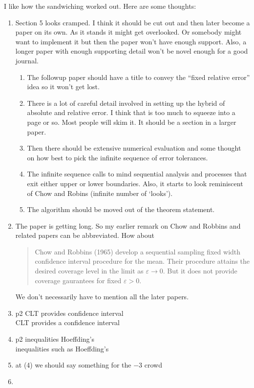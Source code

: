 \documentclass{article}
\begin{document}
I like how the sandwiching worked out.
Here are some thoughts:

\begin{enumerate}
\item 
Section 5 looks cramped.  I think it should be cut
out and then later become a paper on its own. As it
stands it might get overlooked. Or somebody might
want to implement it but then the paper won't have enough
support. Also, a longer paper with enough supporting
detail won't be novel enough for a good journal.
\begin{enumerate}
\item The followup paper should have a
title to convey the ``fixed relative
error'' idea so it won't get lost.
\item
There is a lot of careful detail involved
in setting up the hybrid of absolute and relative error.
I think that is too much to squeeze into a page or so.
Most people will skim it. It should be a section in 
a larger paper.
\item
Then there should be extensive
numerical evaluation and some thought on how best
to pick the infinite sequence of error tolerances. 
\item
The infinite sequence
calls to mind sequential analysis and processes that
exit either upper or lower boundaries. Also, it starts
to look reminiscent of Chow and Robins (infinite number
of `looks').
\item
The algorithm should be moved out of the theorem
statement.
\end{enumerate}
\item
The paper is getting long. So my earlier remark on Chow
and Robbins and related papers can be abbreviated.
How about
\begin{quotation}
Chow and Robbins (1965) develop a sequential sampling
fixed width confidence interval procedure for the mean.
Their procedure attains the desired coverage level
in the limit as $\varepsilon\to 0$.  But it does not provide
coverage gaurantees for fixed $\varepsilon>0$.
\end{quotation}
We don't necessarily have to mention all the later papers.
\item
p2 CLT provides confidence interval\\
CLT provides a confidence interval
\item
p2
inequalities Hoeffding's\\
inequalities such as Hoeffding's
\item
at (4) we should say something for the $-3$ crowd
\item

\end{enumerate}
\end{document}

